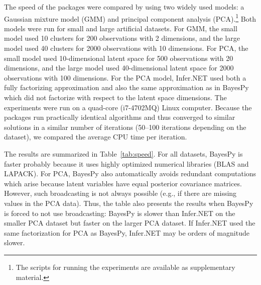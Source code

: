 \documentclass[twoside,11pt]{article}
\begin{document}
The speed of the packages were compared by using two widely used models: a
Gaussian mixture model (GMM) and principal component analysis
(PCA).\footnote{The scripts for running the experiments are available as
  supplementary material.}  Both models were run for small and large artificial
datasets.  For GMM, the small model used 10 clusters for 200 observations with 2
dimensions, and the large model used 40 clusters for 2000 observations with 10
dimensions.  For PCA, the small model used 10-dimensional latent space for 500
observations with 20 dimensions, and the large model used 40-dimensional latent
space for 2000 observations with 100 dimensions.  For the PCA model, Infer.NET
used both a fully factorizing approximation and also the same approximation as
in BayesPy which did not factorize with respect to the latent space dimensions.
The experiments were run on a quad-core (i7-4702MQ) Linux computer.
Because the packages run practically identical algorithms and thus
converged to similar solutions in a similar number of iterations (50--100
iterations depending on the dataset), we compared the average CPU time per
iteration.


The results are summarized in Table~\ref{tab:speed}.  For all datasets, BayesPy
is faster probably because it uses highly optimized numerical libraries (BLAS
and LAPACK).  For PCA, BayesPy also automatically avoids redundant computations
which arise because latent variables have equal posterior covariance matrices.
However, such broadcasting is not always possible (e.g., if there are missing
values in the PCA data).  Thus, the table also presents the results when BayesPy
is forced to not use broadcasting: BayesPy is slower than Infer.NET on the
smaller PCA dataset but faster on the larger PCA dataset.
If Infer.NET used the same factorization for PCA as BayesPy, Infer.NET may be
orders of magnitude slower.
%
\end{document}
